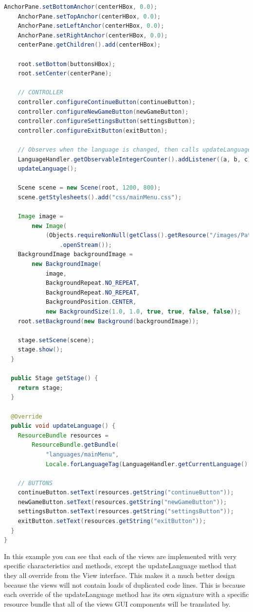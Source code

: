 \documentclass[British]{article}
\begin{document}
\begin{lstlisting}[language=Java,caption={MainMenuView class with View. Source: Primary.}]
    AnchorPane.setBottomAnchor(centerHBox, 0.0);
    AnchorPane.setTopAnchor(centerHBox, 0.0);
    AnchorPane.setLeftAnchor(centerHBox, 0.0);
    AnchorPane.setRightAnchor(centerHBox, 0.0);
    centerPane.getChildren().add(centerHBox);

    root.setBottom(buttonsHBox);
    root.setCenter(centerPane);

    // CONTROLLER
    controller.configureContinueButton(continueButton);
    controller.configureNewGameButton(newGameButton);
    controller.configureSettingsButton(settingsButton);
    controller.configureExitButton(exitButton);

    // Observes when the language is changed, then calls updateLanguage()
    LanguageHandler.getObservableIntegerCounter().addListener((a, b, c) -> updateLanguage());
    updateLanguage();

    Scene scene = new Scene(root, 1200, 800);
    scene.getStylesheets().add("css/mainMenu.css");

    Image image =
        new Image(
            (Objects.requireNonNull(getClass().getResource("/images/PathsTitleScreen.png")))
                .openStream());
    BackgroundImage backgroundImage =
        new BackgroundImage(
            image,
            BackgroundRepeat.NO_REPEAT,
            BackgroundRepeat.NO_REPEAT,
            BackgroundPosition.CENTER,
            new BackgroundSize(1.0, 1.0, true, true, false, false));
    root.setBackground(new Background(backgroundImage));

    stage.setScene(scene);
    stage.show();
  }

  public Stage getStage() {
    return stage;
  }

  @Override
  public void updateLanguage() {
    ResourceBundle resources =
        ResourceBundle.getBundle(
            "languages/mainMenu",
            Locale.forLanguageTag(LanguageHandler.getCurrentLanguage().getLocalName()));

    // BUTTONS
    continueButton.setText(resources.getString("continueButton"));
    newGameButton.setText(resources.getString("newGameButton"));
    settingsButton.setText(resources.getString("settingsButton"));
    exitButton.setText(resources.getString("exitButton"));
  }
}
\end{lstlisting}
In this example you can see that each of the views are implemented with very specific characteristics and methods, except the updateLanguage method that they all override from the View interface. This makes it a much better design because the views will not contain loads of duplicated code lines. This is because each override of the updateLanguage method has its own signature with a specific resource bundle that all of the views GUI components will be translated by. 
\end{document}
